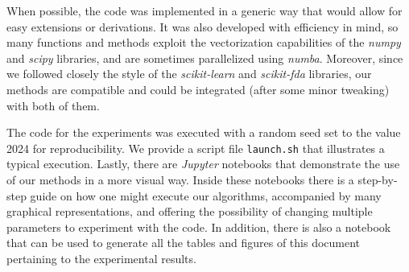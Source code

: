 When possible, the code was implemented in a generic way that would allow for easy extensions or derivations. It was also developed with efficiency in mind, so many functions and methods exploit the vectorization capabilities of the \textit{numpy} and \textit{scipy} libraries, and are sometimes parallelized using \textit{numba}. Moreover, since we followed closely the style of the \textit{scikit-learn} and \textit{scikit-fda} libraries, our methods are compatible and could be integrated (after some minor tweaking) with both of them. 

The code for the experiments was executed with a random seed set to the value 2024 for reproducibility. We provide a script file \texttt{launch.sh} that illustrates a typical execution. Lastly, there are \textit{Jupyter} notebooks that demonstrate the use of our methods in a more visual way. Inside these notebooks there is a step-by-step guide on how one might execute our algorithms, accompanied by many graphical representations, and offering the possibility of changing multiple parameters to experiment with the code. In addition, there is also a notebook that can be used to generate all the tables and figures of this document pertaining to the experimental results.


